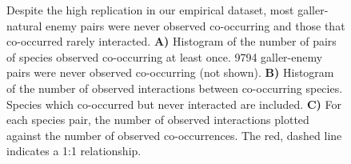 \documentclass[12pt]{article}
\begin{document}
  \begin{figure}[h!]
      \caption{Despite the high replication in our empirical dataset, most galler-natural enemy pairs were never observed co-occurring and those that co-occurred rarely interacted. \textbf{A)} Histogram of the number of pairs of species observed co-occurring at least once. 9794 galler-enemy pairs were never observed co-occurring (not shown).
      \textbf{B)} Histogram of the number of observed interactions between co-occurring species. Species which co-occurred but never interacted are included. 
      \textbf{C)} For each species pair, the number of observed interactions plotted against the number of observed co-occurrences. The red, dashed line indicates a 1:1 relationship.}
      \label{histograms}
      \begin{center}
      \end{center}
      \end{figure}
\end{document}
